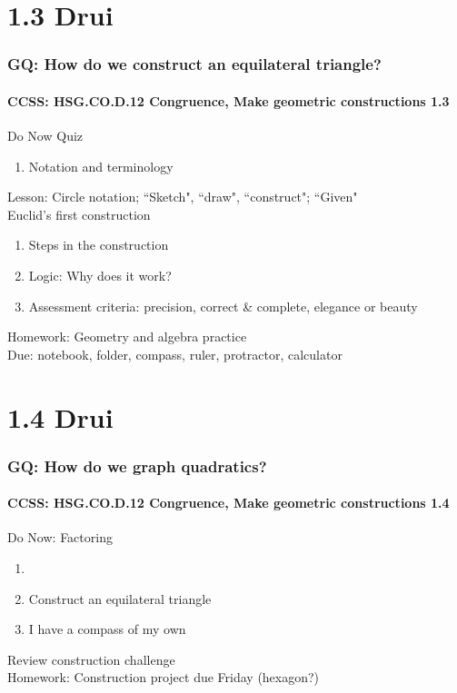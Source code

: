 \documentclass{beamer}
\begin{document}
  \section{1.3 Drui}
  \frame
  {
    \frametitle{GQ: How do we construct an equilateral triangle?}
    \framesubtitle{CCSS: HSG.CO.D.12 Congruence, Make geometric constructions \qquad \alert{1.3}}

    \begin{block}{Do Now Quiz}
    \begin{enumerate}
        \item Notation and terminology
    \end{enumerate}
    \end{block}
    Lesson: Circle notation; ``Sketch", ``draw", ``construct"; ``Given"\\[5pt]
    Euclid's first construction
    \begin{enumerate}
        \item Steps in the construction
        \item Logic: Why does it work?
        \item Assessment criteria: precision, correct \& complete, elegance or beauty
    \end{enumerate}
    \vspace{1cm}
    Homework: Geometry and algebra practice\\
    Due: notebook, folder, compass, ruler, protractor, calculator
  }

  \section{1.4 Drui}
  \frame
  {
    \frametitle{GQ: How do we graph quadratics?}
    \framesubtitle{CCSS: HSG.CO.D.12 Congruence, Make geometric constructions  \alert{1.4}}

    \begin{block}{Do Now: Factoring}
    \begin{enumerate}
        \item
        \item Construct an equilateral triangle
        \item I have a compass of my own
    \end{enumerate}
    \end{block}
    Review construction challenge\\
    \vspace{2cm}
    Homework: Construction project due Friday (hexagon?)
  }
\end{document}
